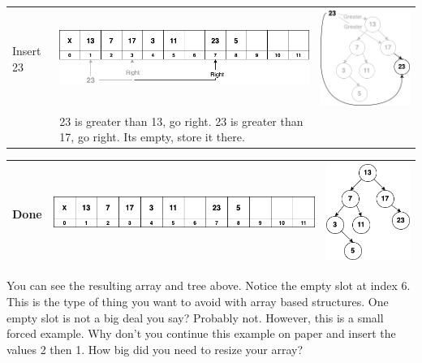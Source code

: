 \begin{center}
\begin{tabular}{|M{0.10\textwidth}|M{0.50\textwidth} M{0.35\textwidth}|}
\hline
Insert 23 &
\includegraphics[scale=.4]{images/binary_tree_array_07.png} & 
\includegraphics[scale=.4]{images/binary_tree_example_07.png}\\
& \footnotesize{23 is greater than 13, go right. 23 is greater than 17, go right. Its empty, store it there.} &   \\
\hline
\end{tabular}
\end{center}
\begin{center}
\begin{tabular}{|M{0.10\textwidth}|M{0.50\textwidth} M{0.35\textwidth}|}
\hline
Done &
\includegraphics[scale=.4]{images/binary_tree_array_08.png} & 
\includegraphics[scale=.4]{images/binary_tree_example_08.png}\\
\hline
\end{tabular}
\end{center}

You can see the resulting array and tree above. Notice the empty slot at index 6. This is the type of thing you want to avoid with array based structures. One empty slot is not a big deal you say? Probably not. However, this is a small forced example. Why don't you continue this example on paper and insert the values 2 then 1. How big did you need to resize your array?\\
